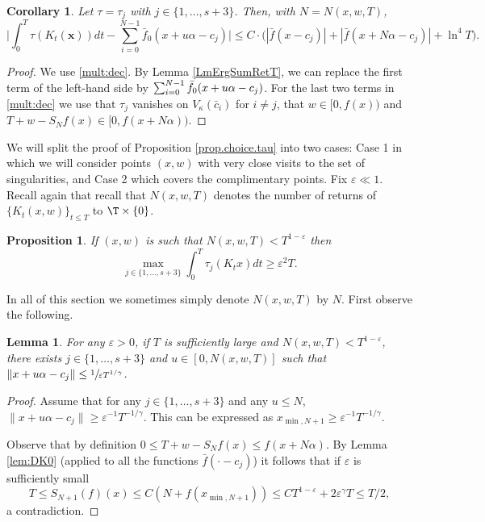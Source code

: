 \documentclass[10pt]{amsart}
\let\DS\relax
\newcommand\bx{\boldsymbol{x}}
\let\eps\varepsilon
\theoremstyle{definition}
\theoremstyle{plain}
\newtheorem{lemma}[definition]{Lemma}
\newtheorem{corollary}[definition]{Corollary}
\newtheorem{proposition}[definition]{Proposition}
\begin{document}
\begin{corollary} \label{LmErgSumRetT2}
Let $\tau=\tau_j$ with $j\in \{1,\ldots, s+3\}$. Then, with $N=N(x,w,T)$,\vspace*{-3pt}
\[
\biggl|\int_{0}^T\tau(K_t(\bx))dt-\sum_{i=0}^{N-1} \bar{f}_0(x+u\alpha-c_j) \biggr|\leq C\cdot\Big(|\bar{f}(x-c_j)|+|\bar{f}(x+N\alpha-c_j)|+\ln^4T\Big).
\]
\end{corollary}

\begin{proof}
We use \eqref{mult:dec}. By Lemma \ref{LmErgSumRetT}, we can
replace the first term of the left-hand side by $\DS \sum_{i=0}^{N-1} \bar{f}_0(x+u\alpha-c_j)$. For the last two terms
in \eqref{mult:dec}
we use that $\tau_j$ vanishes on $V_\kappa(\bar{c}_i)$ for $i\neq j$, that
$ w \in [0,f(x))$ and $T+w-S_Nf(x)\in [0,f(x+N\alpha))$.
\end{proof}

We will split the proof of Proposition \ref{prop.choice.tau} into two cases:
Case 1 in which we will consider points $(x,w)$ with very close visits to the set of singularities, and Case 2 which covers the complimentary points. Fix $\eps\ll 1$. Recall again that recall that $N(x,w,T)$ denotes the number of returns of $\{K_t(x,w)\}_{t\leq T}$ to
$\T\times \{0\}$.

\Subsection*{Case 1. $N(x,w,T)<T^{1-\eps}$}

\begin{proposition} \label{prop.Nsmall} If $(x,w)$ is such that $N(x,w,T)<T^{1-\eps}$ then\vspace*{-3pt}
\begin{equation*} %
\max_{j\in \{1,\ldots,s+3\}} \int_0^T\tau_j(K_tx)dt \geq \eps^2 T.
\end{equation*}
\end{proposition}

In all of this section we sometimes simply denote $N(x,w,T)$ by $N$. First observe the following.

\begin{lemma} \label{lemma.Nsmall2} For any $\eps>0$, if $T$ is sufficiently large and $N(x,w,T)<T^{1-\eps}$, there exists $j\in \{1,\ldots, s+3\}$ and $u\in [0,N(x,w,T)]$ such that $\|x+u\alpha-c_j\|\leq \sfrac{1}{\eps T^{1/\gamma}}$.
\end{lemma}

\begin{proof} Assume that for any $j\in \{1,\ldots, s+3\}$ and any $u\leq N$, $\|x+u\alpha-c_j\|\geq \eps^{-1} T^{-1/\gamma}$. This can be expressed as $x_{\min,N+1}\geq \eps^{-1} T^{-1/\gamma}$.

Observe that by definition $0\leq T+w-S_{N}f(x)\leq f(x+N\alpha)$. By Lemma \ref{lem:DK0} (applied to all the functions $\bar{f}(\cdot-c_j)$) it follows that if $\eps$ is sufficiently small\vspace*{-3pt}
\[
T\leq S_{N+1}(f)(x)\leq C(N+ f(x_{\min,N+1}))\leq CT^{1-\eps}+ 2\eps^\gamma T\leq T/2,
\]
a contradiction.
\end{proof}
\end{document}
